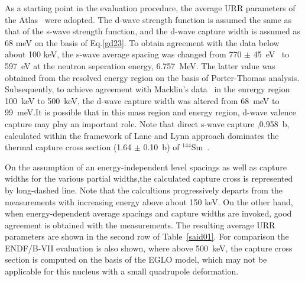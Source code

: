 \documentclass[twocolumn,amsmath,amssymb,10pt,groupedaddress,a4paper]{revtex4}
\begin{document}
As a starting point in the evaluation procedure, the average URR parameters of the Atlas~\cite{Mughabghab:06} were adopted. The d-wave strength function is assumed the same as that of the s-wave strength function, and the d-wave capture width is assumed as 68 meV on the basis of Eq.\ref{gd23}. To obtain agreement with the data  below about 100 keV, the s-wave average spacing was changed from 770 $\pm$ 45~eV~\cite{Mughabghab:06} to 597~eV at the neutron seperation energy, 6.757~MeV. The latter value was obtained from the resolved energy region on the basis of Porter-Thomas analysis. Subsequently, to achieve agreement with Macklin's data~\cite{Macklin:93}  in the enrergy region 100~keV to 500~keV, the d-wave capture width was altered from 68~meV to 99~meV.It is possible that in this mass region and energy region, d-wave valence capture may play an important role. Note that direct s-wave capture ,0.958~b, calculated within the framework of Lane and Lynn approach \cite{Lane:61} dominates the thermal  capture cross section (1.64 $\pm$ 0.10~b) of $^{144}$Sm~\cite{Mughabghab:79}.

On the assumption of an energy-independent level spacings as well as capture widths for the various partial widths,the calculated capture cross is represented by  long-dashed line. Note that the calcultions progressively departs  from the measurements with increasing energy above about 150 keV. On the other hand, when energy-dependent average spacings and capture widths are invoked, good agreement is obtained with the measurements. The resulting average URR parameters are shown in the second row of Table~\ref{said01}. For comparison the ENDF/B-VII evaluation is also shown, where above 500~keV, the capture cross section is computed on the basis of the EGLO \cite{kop01} model, which may not be applicable for this nucleus with a small quadrupole deformation.
\end{document}

